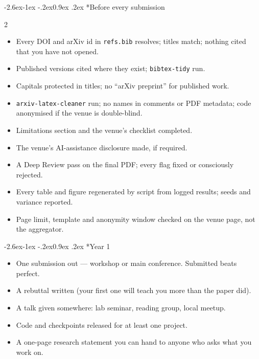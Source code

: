\documentclass[11pt,a4paper]{article}
\makeatletter
\renewcommand\subsection{\@startsection{subsection}{2}{\z@}%
  {-2.6ex\@plus -1ex \@minus -.2ex}{0.9ex \@plus .2ex}%
  {\normalfont\large\bfseries\color{brandlight}}}
\newcommand{\code}[1]{\texttt{\small #1}}
\makeatother
\begin{document}
\subsection*{Before every submission}
\begin{multicols}{2}
\begin{itemize}
  \item Every DOI and arXiv id in \code{refs.bib} resolves; titles match;
        nothing cited that you have not opened.
  \item Published versions cited where they exist; \code{bibtex-tidy} run.
  \item Capitals protected in titles; no ``arXiv preprint'' for published
        work.
  \item \code{arxiv-latex-cleaner} run; no names in comments or PDF
        metadata; code anonymised if the venue is double-blind.
  \item Limitations section and the venue's checklist completed.
  \item The venue's AI-assistance disclosure made, if required.
  \item A Deep Review pass on the final PDF; every flag fixed or consciously
        rejected.
  \item Every table and figure regenerated by script from logged results;
        seeds and variance reported.
  \item Page limit, template and anonymity window checked on the venue
        page, not the aggregator.
\end{itemize}
\end{multicols}

\subsection*{Year 1}
\begin{itemize}
  \item One submission out --- workshop or main conference. Submitted beats
        perfect.
  \item A rebuttal written (your first one will teach you more than the paper
        did).
  \item A talk given somewhere: lab seminar, reading group, local meetup.
  \item Code and checkpoints released for at least one project.
  \item A one-page research statement you can hand to anyone who asks what you
        work on.
\end{itemize}
\end{document}
